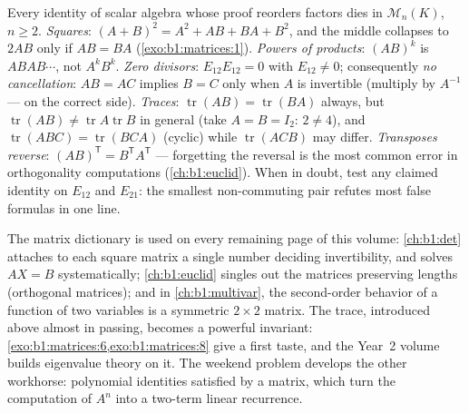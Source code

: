 \begin{remark}
\label{rem:b1:matrices:pitfalls}
Every identity of scalar algebra whose proof reorders factors
dies in $\mathcal{M}_n(K)$, $n \geq 2$.
\emph{Squares}: $(A + B)^2 = A^2 + AB + BA + B^2$, and the
middle collapses to $2AB$ only if $AB = BA$
(\cref{exo:b1:matrices:1}).
\emph{Powers of products}: $(AB)^k$ is $ABAB\cdots$, not
$A^kB^k$.
\emph{Zero divisors}: $E_{12}E_{12} = 0$ with $E_{12} \neq 0$;
consequently \emph{no cancellation}: $AB = AC$ implies $B = C$
only when $A$ is invertible (multiply by $A^{-1}$ --- on the
correct side).
\emph{Traces}: $\operatorname{tr}(AB) = \operatorname{tr}(BA)$
always, but $\operatorname{tr}(AB) \neq
\operatorname{tr}A\operatorname{tr}B$ in general (take $A = B =
I_2$: $2 \neq 4$), and $\operatorname{tr}(ABC) =
\operatorname{tr}(BCA)$ (cyclic) while $\operatorname{tr}(ACB)$
may differ.
\emph{Transposes reverse}: $(AB)^{\mathsf T} = B^{\mathsf
T}A^{\mathsf T}$ --- forgetting the reversal is the most common
error in orthogonality computations (\cref{ch:b1:euclid}).
When in doubt, test any claimed identity on $E_{12}$ and
$E_{21}$: the smallest non-commuting pair refutes most false
formulas in one line.
\end{remark}

\begin{remark}
\label{rem:b1:matrices:whereused}
The matrix dictionary is used on every remaining page of this
volume: \cref{ch:b1:det} attaches to each square matrix a single
number deciding invertibility, and solves $AX = B$
systematically; \cref{ch:b1:euclid} singles out the matrices
preserving lengths (orthogonal matrices); and in
\cref{ch:b1:multivar}, the second-order behavior of a function of
two variables is a symmetric $2 \times 2$ matrix. The trace,
introduced above almost in passing, becomes a powerful invariant:
\cref{exo:b1:matrices:6,exo:b1:matrices:8} give a first taste,
and the Year~2 volume builds eigenvalue theory on it. The weekend
problem develops the other workhorse: polynomial identities
satisfied by a matrix, which turn the computation of $A^n$ into
a two-term linear recurrence.
\end{remark}

